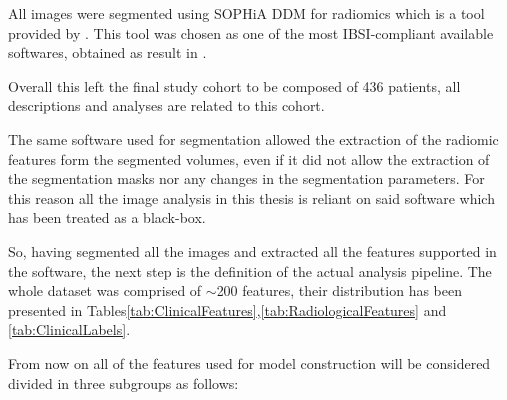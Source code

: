 All images were segmented using SOPHiA DDM for radiomics \cite{Sophiarad} which is a tool provided by \orsola.
This tool was chosen as one of the most IBSI-compliant available softwares, obtained as result in \cite{IBSI-Compliance}.

Overall this left the final study cohort to be composed of 436 patients, all descriptions and analyses are related to this cohort.

The same software used for segmentation allowed the extraction of the radiomic features form the segmented volumes, even if it did not allow the extraction of the segmentation masks nor any changes in the segmentation parameters. For this reason all the image analysis in this thesis is reliant on said software which has been treated as a black-box.

So, having segmented all the images and extracted all the features supported in the software, the next step is the definition of the actual analysis pipeline. The whole dataset was comprised of $\sim$200 features, their distribution has been presented in Tables\ref{tab:ClinicalFeatures},\ref{tab:RadiologicalFeatures} and \ref{tab:ClinicalLabels}.

From now on all of the features used for model construction will be considered divided in three subgroups as follows:

